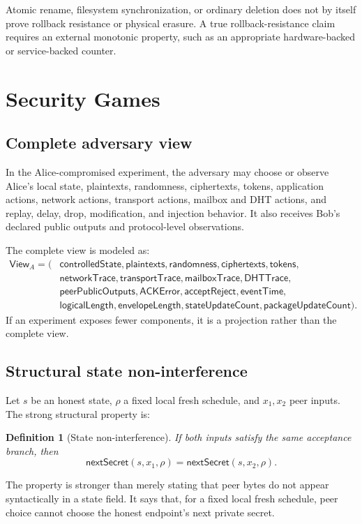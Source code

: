 \documentclass[11pt,letterpaper]{article}
\newtheorem{definition}{Definition}[section]
\newcommand{\View}{\mathsf{View}}
\begin{document}
Atomic rename, filesystem synchronization, or ordinary deletion does not by itself prove
rollback resistance or physical erasure. A true rollback-resistance claim requires an
external monotonic property, such as an appropriate hardware-backed or service-backed
counter.

\section{Security Games}
\label{sec:games}

\subsection{Complete adversary view}

In the Alice-compromised experiment, the adversary may choose or observe Alice's local
state, plaintexts, randomness, ciphertexts, tokens, application actions, network actions,
transport actions, mailbox and DHT actions, and replay, delay, drop, modification, and
injection behavior. It also receives Bob's declared public outputs and protocol-level
observations.

The complete view is modeled as:
\begin{align*}
  \View_A = (&\mathsf{controlledState},\mathsf{plaintexts},\mathsf{randomness},
  \mathsf{ciphertexts},\mathsf{tokens},\\
  &\mathsf{networkTrace},\mathsf{transportTrace},\mathsf{mailboxTrace},
  \mathsf{DHTTrace},\\
  &\mathsf{peerPublicOutputs},\mathsf{ACKError},\mathsf{acceptReject},
  \mathsf{eventTime},\\
  &\mathsf{logicalLength},\mathsf{envelopeLength},
  \mathsf{stateUpdateCount},\mathsf{packageUpdateCount}).
\end{align*}
If an experiment exposes fewer components, it is a projection rather than the complete
view.

\subsection{Structural state non-interference}

Let $s$ be an honest state, $\rho$ a fixed local fresh schedule, and $x_1,x_2$ peer inputs.
The strong structural property is:
\begin{definition}[State non-interference]
If both inputs satisfy the same acceptance branch, then
\[
  \mathsf{nextSecret}(s,x_1,\rho)=\mathsf{nextSecret}(s,x_2,\rho).
\]
\end{definition}
The property is stronger than merely stating that peer bytes do not appear syntactically
in a state field. It says that, for a fixed local fresh schedule, peer choice cannot choose
the honest endpoint's next private secret.
\end{document}
